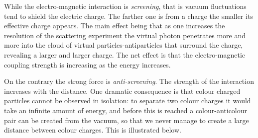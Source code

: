 \documentclass[12pt]{article}
\begin{document}
While the electro-magnetic interaction is \emph{screening}, that is vacuum fluctuations tend to shield the electric charge. The farther one is from a charge the smaller its effective charge appears. The main effect being that as one increases the resolution of the scattering experiment the virtual photon penetrates more and more into the cloud of virtual particles-antiparticles that surround the charge, revealing a larger and larger charge. The net effect is that the electro-magnetic coupling strength is increasing as the energy increases. 

On the contrary the strong force is \emph{anti-screening}. The strength of the interaction increases with the distance. One dramatic consequence is that colour charged particles cannot be observed in isolation: to separate two colour charges it would take an infinite amount of energy, and before this is reached a colour-anticolour pair can be created from the vacuum, so that we never manage to create a large distance between colour charges. This is illustrated below.
\end{document}
